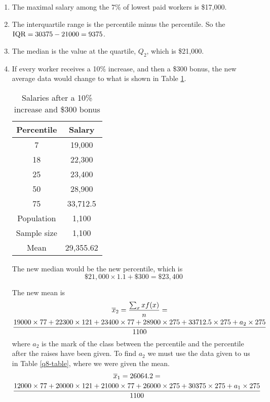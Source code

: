 \documentclass[fleqn]{article}
\begin{document}
\begin{answers}
	\begin{enumerate}
		\item %
		The maximal salary among the 7\% of lowest paid workers is \$17,000.

		\item %
		The interquartile range  is the  percentile minus the  percentile. So the \(\text{IQR} = 30375 - 21000 = 9375\).

		\item %
		The median is the value at the  quartile, \(Q_2\), which is \$21,000.

		\item %
		If every worker receives a 10\% increase, and then a \$300 bonus, the new average data would change to what is shown in Table \ref{q8d-table}.

		\begin{table}[b]
			\centering
			\begin{tabular}{||c|c||}
				\hline
				Percentile  & Salary    \\
				\hline
				7           & 19,000    \\
				18          & 22,300    \\
				25          & 23,400    \\
				50          & 28,900    \\
				75          & 33,712.5  \\
				\hline
				\hline
				Population  & 1,100     \\
				Sample size & 1,100     \\
				\hline
				Mean        & 29,355.62 \\
				\hline
			\end{tabular}
			\caption{Salaries after a 10\% increase and \$300 bonus}
			\label{q8d-table}
		\end{table}

		The new median would be the new  percentile, which is
		\[\$21,000 \times 1.1 + \$300 = \$23,400\]

		The new mean is
		\begin{multline*}
			\overline{x}_2 = \frac{\sum_x xf(x)}{n} = \\
			\frac{19000 \times 77 + 22300 \times 121 + 23400 \times 77 + 28900 \times 275 + 33712.5 \times 275 + a_2 \times 275}{1100}
		\end{multline*}
		where \(a_2\) is the mark of the class between the  percentile and the  percentile after the raises have been given. To find \(a_2\) we must use the data given to us in Table \ref{q8-table}, where we were given the mean.
		\begin{multline*}
			\overline{x}_1 = 26064.2 = \\
			\frac{12000 \times 77 + 20000 \times 121 + 21000 \times 77 + 26000 \times 275 + 30375 \times 275 + a_1 \times 275}{1100}
		\end{multline*}


\end{enumerate}
\end{answers}
\end{document}
